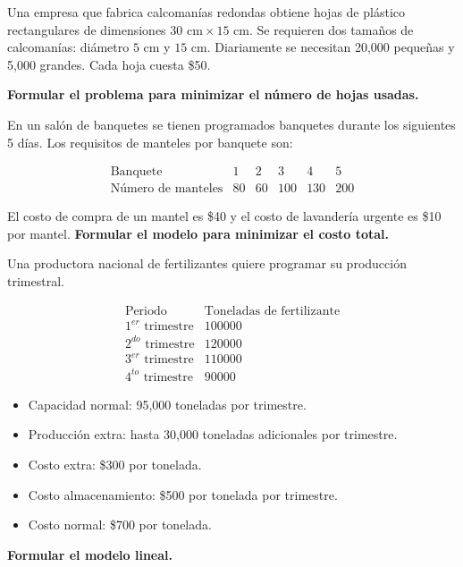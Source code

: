 \begin{Ejer}
Una empresa que fabrica calcoman\'ias redondas obtiene hojas de pl\'astico rectangulares de dimensiones $30\text{ cm} \times 15\text{ cm}$. Se requieren dos tama\~nos de calcoman\'ias: di\'ametro $5$ cm y $15$ cm. Diariamente se necesitan 20,000 peque\~nas y 5,000 grandes. Cada hoja cuesta \$50.

\textbf{Formular el problema para minimizar el n\'umero de hojas usadas.}
\end{Ejer}

\begin{Ejer} En un sal\'on de banquetes se tienen programados banquetes durante los siguientes 5 d\'ias. Los requisitos de manteles por banquete son:

\[
\begin{array}{c|ccccc}
\text{Banquete} & 1 & 2 & 3 & 4 & 5 \\
\text{N\'umero de manteles} & 80 & 60 & 100 & 130 & 200
\end{array}
\]

El costo de compra de un mantel es \$40 y el costo de lavander\'ia urgente es \$10 por mantel. \textbf{Formular el modelo para minimizar el costo total.}

\end{Ejer}

\begin{Ejer} Una productora nacional de fertilizantes quiere programar su producci\'on trimestral.

\[
\begin{array}{c|c}
\text{Periodo} & \text{Toneladas de fertilizante} \\
\hline
1^{er} \text{ trimestre} & 100000 \\
2^{do} \text{ trimestre} & 120000 \\
3^{er} \text{ trimestre} & 110000 \\
4^{to} \text{ trimestre} & 90000
\end{array}
\]
\begin{itemize}
\item[a) ] Capacidad normal: 95,000 toneladas por trimestre.

\item[b) ] Producci\'on extra: hasta 30,000 toneladas adicionales por trimestre.

\item[c) ] Costo extra: \$300 por tonelada.  
\item[d) ] Costo almacenamiento: \$500 por tonelada por trimestre.  
\item[e) ] Costo normal: \$700 por tonelada.
\end{itemize}
\textbf{Formular el modelo lineal.}

\end{Ejer}

